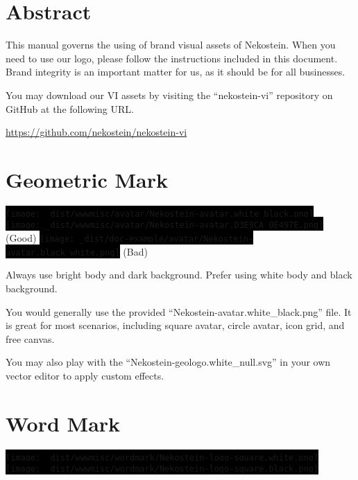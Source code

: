 \documentclass[a4paper,11pt]{article}
\begin{document}
\sffamily


\newcommand{\altfbox}[1]{%
    \colorbox{black}{#1}%
}







\section{Abstract}
This manual governs the using of brand visual assets of Nekostein.
When you need to use our logo, please follow the instructions included in this document.
Brand integrity is an important matter for us, as it should be for all businesses.

You may download our VI assets by visiting the ``nekostein-vi'' repository on GitHub at the following URL.

\begin{center}
    \href{https://github.com/nekostein/nekostein-vi}{https://github.com/nekostein/nekostein-vi}
\end{center}






\section{Geometric Mark}
\altfbox{\texttt{[image: \_dist/wwwmisc/avatar/Nekostein-avatar.white\_black.png]}}~~%
\altfbox{\texttt{[image: \_dist/wwwmisc/avatar/Nekostein-avatar.D3E9CA\_0E497E.png]}} (Good)
\hfill
\altfbox{\texttt{[image: \_dist/doc-example/avatar/Nekostein-avatar.black\_white.png]}} (Bad)

Always use bright body and dark background. Prefer using white body and black background.

You would generally use the provided ``Nekostein-avatar.white\_black.png'' file.
It is great for most scenarios, including square avatar, circle avatar, icon grid, and free canvas.

You may also play with the ``Nekostein-geologo.white\_null.svg'' in your own vector editor to apply custom effects.






\section{Word Mark}
\altfbox{\texttt{[image: \_dist/wwwmisc/wordmark/Nekostein-logo-square.white.png]}}~~%
\altfbox{\texttt{[image: \_dist/wwwmisc/wordmark/Nekostein-logo-square.black.png]}}
\end{document}
